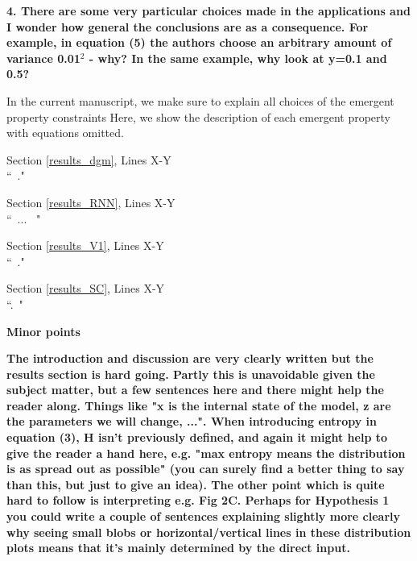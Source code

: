 \documentclass[11pt,a4paper]{article}
\begin{document}
\textbf{4. There are some very particular choices made in the applications and I wonder how general the conclusions are as a consequence. For example, in equation (5) the authors choose an arbitrary amount of variance 0.01$^2$ - why? In the same example, why look at y=0.1 and 0.5? }

In the current manuscript, we make sure to explain all choices of the emergent property constraints  Here, we show the description of each emergent property with equations omitted.

\begin{displayquote}
Section \ref{results_dgm}, Lines X-Y\\
``~."
\end{displayquote}

\begin{displayquote}
Section \ref{results_RNN}, Lines X-Y\\
``~... ~"
\end{displayquote}

\begin{displayquote}
Section \ref{results_V1}, Lines X-Y\\
``~."
\end{displayquote}

\begin{displayquote}
Section \ref{results_SC}, Lines X-Y\\
``.~"
\end{displayquote}
\textbf{Minor points }

\textbf{The introduction and discussion are very clearly written but the results section is hard going. Partly this is unavoidable given the subject matter, but a few sentences here and there might help the reader along. Things like "x is the internal state of the model, z are the parameters we will change, ...". When introducing entropy in equation (3), H isn't previously defined, and again it might help to give the reader a hand here, e.g. "max entropy means the distribution is as spread out as possible" (you can surely find a better thing to say than this, but just to give an idea). The other point which is quite hard to follow is interpreting e.g. Fig 2C. Perhaps for Hypothesis 1 you could write a couple of sentences explaining slightly more clearly why seeing small blobs or horizontal/vertical lines in these distribution plots means that it's mainly determined by the direct input. }
\end{document}
